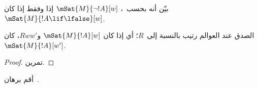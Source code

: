 \documentclass[../../../include/open-logic-section]{subfiles}
\begin{document}
\begin{prob}
  بيّن أنه بحسب~،
  $\mSat{M}{\lnot !A}[w]$ إذا وفقط إذا كان
  $\mSat{M}{!A \lif \lfalse}[w]$.
\end{prob}

\begin{prop}
  الصدق عند العوالم رتيب بالنسبة إلى~$R$؛ أي إذا كان
  $\mSat{M}{!A}[w]$ و$Rww'$، كان~$\mSat{M}{!A}[w']$.
\end{prop}

\begin{proof}
  تمرين.
\end{proof}

\begin{prob}
  أقم برهان~.
\end{prob}
\end{document}
